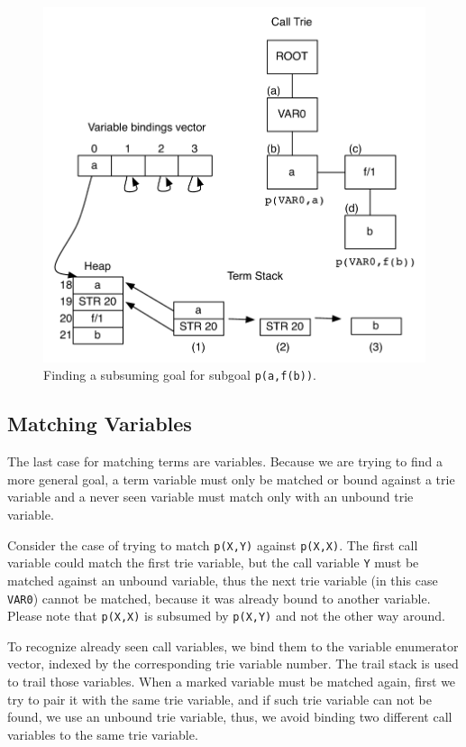 \begin{figure}[ht]
  \centering
    \includegraphics[scale=0.6]{match_functor.pdf}
  \caption{Finding a subsuming goal for subgoal \texttt{p(a,f(b))}.}
  \label{fig:match_functor}
\end{figure}

\subsection{Matching Variables}

The last case for matching terms are variables. Because we are trying to find a more general goal,
a term variable must only be matched or bound against a trie variable and a
never seen variable must match only with an unbound trie variable.

Consider the case of trying to match \texttt{p(X,Y)} against \texttt{p(X,X)}.
The first call variable could match the first trie variable,
but the call variable \texttt{Y} must be matched against an unbound variable, thus the next trie variable
(in this case \texttt{VAR0}) cannot be matched, because it was already bound to another variable.
Please note that \texttt{p(X,X)} is subsumed by \texttt{p(X,Y)} and not the other way around.

To recognize already seen call variables, we bind them to the variable enumerator vector, indexed
by the corresponding trie variable number. The trail stack is used to trail those variables.
When a marked variable must be matched again, first we try to pair it with the same trie variable,
and if such trie variable can not be found, we use an unbound trie variable, thus,
we avoid binding two different call variables to the same trie variable.

